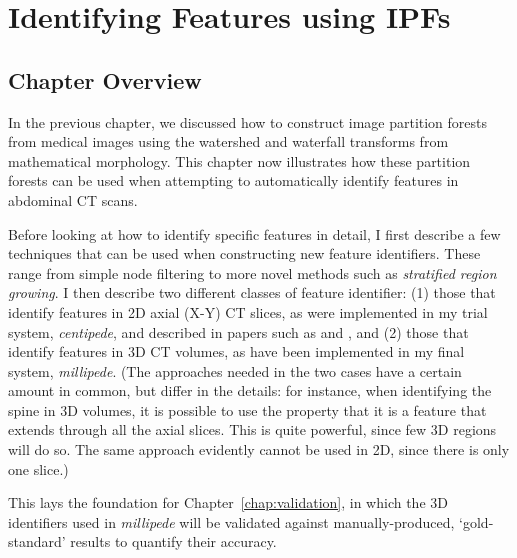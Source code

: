 \chapter{Identifying Features using IPFs}
\label{chap:featureid}

\section{Chapter Overview}

In the previous chapter, we discussed how to construct image partition forests from medical images using the watershed and waterfall transforms from mathematical morphology. This chapter now illustrates how these partition forests can be used when attempting to automatically identify features in abdominal CT scans.

Before looking at how to identify specific features in detail, I first describe a few techniques that can be used when constructing new feature identifiers. These range from simple node filtering to more novel methods such as \emph{stratified region growing}. I then describe two different classes of feature identifier: (1) those that identify features in 2D axial (X-Y) CT slices, as were implemented in my trial system, \emph{centipede}, and described in papers such as \cite{gvccimi08} and \cite{gvcispa09}, and (2) those that identify features in 3D CT volumes, as have been implemented in my final system, \emph{millipede}. (The approaches needed in the two cases have a certain amount in common, but differ in the details: for instance, when identifying the spine in 3D volumes, it is possible to use the property that it is a feature that extends through all the axial slices. This is quite powerful, since few 3D regions will do so. The same approach evidently cannot be used in 2D, since there is only one slice.)

This lays the foundation for Chapter~\ref{chap:validation}, in which the 3D identifiers used in \emph{millipede} will be validated against manually-produced, `gold-standard' results to quantify their accuracy.



